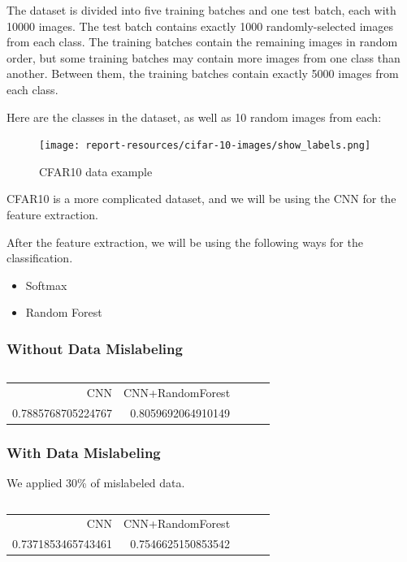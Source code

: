 \documentclass{article}
\begin{document}
The dataset is divided into five training batches and one test batch, each with 10000 images. The test batch contains exactly 1000 randomly-selected images from each class. The training batches contain the remaining images in random order, but some training batches may contain more images from one class than another. Between them, the training batches contain exactly 5000 images from each class.

Here are the classes in the dataset, as well as 10 random images from each:

\begin{figure}[H]
    \centering
    \texttt{[image: report-resources/cifar-10-images/show\_labels.png]}
    \caption{CFAR10 data example}
\end{figure}

CFAR10 is a more complicated dataset, and we will be using the CNN for the feature extraction. 

After the feature extraction, we will be using the following ways for the classification. 
\begin{itemize}
    \item Softmax
    \item Random Forest
\end{itemize}

\subsubsection{Without Data Mislabeling}

\inputminted[frame=single,framesep=10pt,fontsize=\footnotesize]{python}{cifar10/main.py}

\begin{table}[H]
    \centering
    \begin{tabular}{rrrrr}
        CNN &  CNN+RandomForest   \\
        0.7885768705224767 &       0.8059692064910149  \\
    \end{tabular}
\end{table}

\subsubsection{With Data Mislabeling}

We applied 30\% of mislabeled data. 

\inputminted[firstline=32,lastline=54,frame=single,framesep=10pt,fontsize=\footnotesize]{python}{cifar10-mislabeled/main.py}


\begin{table}[H]
    \centering
    \begin{tabular}{rrrrr}
        CNN &  CNN+RandomForest   \\
        0.7371853465743461 &       0.7546625150853542  \\
    \end{tabular}
\end{table}


\end{document}
